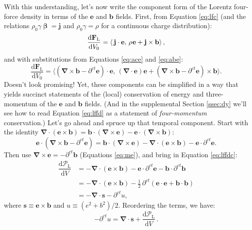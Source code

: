 \documentclass[12pt]{article}
\renewcommand{\vv}[1]{\mathbf{#1}}
\newcommand{\dd}[1]{\mathrm{d}#1}
\newcommand{\vvbeta}{\bm{\upbeta}}
\newcommand{\del}{\boldsymbol{\nabla}}
\begin{document}
With this understanding, let's now write the component form of the Lorentz four-force density in terms of the $\vv e$ and $\vv b$ fields. First, from Equation \ref{eq:lfc} (and the relations $\rho_0 \gamma \vvbeta = \vv j$ and $\rho_0 \gamma = \rho$ for a continuous charge distribution):
\begin{equation*}
\dfrac{\dd \vv F_{\mathrm{L}}}{\dd V_0} = \left \langle \, \vv j \cdot \vv e, \, \rho \mkern1mu \vv e + \vv j \times \vv b \right \rangle ,
\end{equation*}
and with substitutions from Equations \ref{eq:ace} and \ref{eq:abe}:
\begin{equation}\label{eq:lffdc2}
\dfrac{\dd \vv F_{\mathrm{L}}}{\dd V_0} = \Big \langle \left( \del \times \vv b - \partial^{ct} \vv e \right) \cdot \vv e , \, \left( \del \cdot \vv e \right) \vv e + \left( \del \times \vv b - \partial^{ct} \vv e \right) \times \vv b \Big \rangle .
\end{equation}
Doesn't look promising! Yet, these components can be simplified in a way that yields succinct statements of the (local) conservation of energy and three-momentum of the $\vv e$ and $\vv b$ fields. (And in the supplemental Section \ref{ssec:dy} we'll see how to read Equation \ref{eq:lffd} as a statement of \emph{four-momentum} conservation.) Let's go ahead and spruce up that temporal component. Start with the identity $\del \cdot (\vv e \times \vv b) = \vv b \cdot (\del \times \vv e) - \vv e \cdot (\del \times \vv b)$:
\begin{equation*}
\vv e \cdot \left( \del \times \vv b - \partial^{ct} \vv e \right) = \vv b \cdot \left( \del \times \vv e \right) - \del \cdot \left( \vv e \times \vv b \right) - \vv e \cdot \partial^{ct} \vv e .
\end{equation*}
Then use $\del \times \vv e = - \partial^{ct} \vv b$ (Equations \ref{eq:me}), and bring in Equation \ref{eq:lffdc}:
\begin{equation*}
\begin{split}
\dfrac{\dd \mathcal{P}_{\textrm{L}}}{\dd V} &= - \del \cdot \left( \vv e \times \vv b \right) - \vv e \cdot \partial^{ct} \vv e - \vv b \cdot \partial^{ct} \vv b  \\
&= - \del \cdot \left( \vv e \times \vv b \right) - \frac{1}{2} \, \partial^{ct} \left( \vv e \cdot \vv e + \vv b \cdot \vv b \right) \\[2pt]
&= - \del \cdot \vv s - \partial^{ct} u ,
\end{split}
\end{equation*}
where $\vv s \equiv \vv e \times \vv b$ and $u \equiv (e^2 + b^2)/2$. Reordering the terms, we have:
\begin{equation}\label{eq:py}
\boxed{ - \partial^{ct} u =  \del \cdot \vv s + \dfrac{\dd \mathcal{P}_{\textrm{L}}}{\dd V} } \, .
\end{equation}
\end{document}
